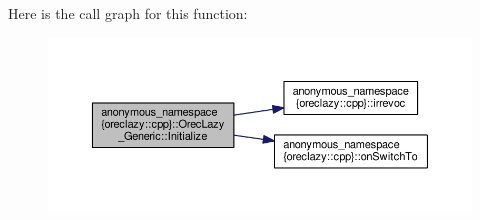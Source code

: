 Here is the call graph for this function\-:
\nopagebreak
\begin{figure}[H]
\begin{center}
\leavevmode
\includegraphics[width=350pt]{structanonymous__namespace_02oreclazy_8cpp_03_1_1OrecLazy__Generic_a8ed6362358dee002d91bb3d47535b77b_cgraph}
\end{center}
\end{figure}


